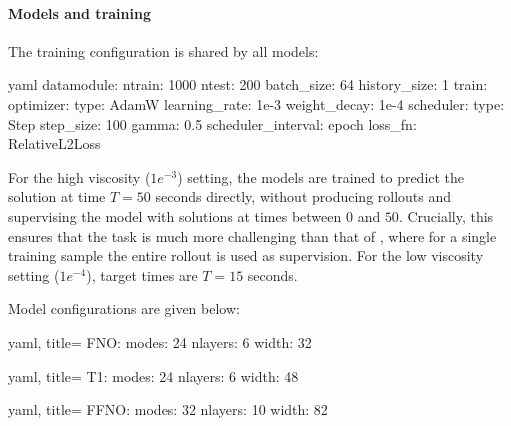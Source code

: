 \paragraph{Models and training}
%
The training configuration is shared by all models:

\begin{listing}[H]
\begin{mintedbox}{yaml}
datamodule: 
    ntrain: 1000
    ntest: 200
    batch_size: 64
    history_size: 1
train:
    optimizer: 
        type: AdamW
        learning_rate: 1e-3
        weight_decay: 1e-4
    scheduler: 
        type: Step
        step_size: 100
        gamma: 0.5
        scheduler_interval: epoch
loss_fn: RelativeL2Loss
\end{mintedbox}
\vspace{-6mm}
\end{listing}
%
For the high viscosity ($1e^{-3}$) setting, the models are trained to predict the solution at time $T=50$ seconds directly, without producing rollouts and supervising the model with solutions at times between $0$ and $50$. Crucially, this ensures that the task is much more challenging than that of \citep{li2020fourier}, where for a single training sample the entire rollout is used as supervision. For the low viscosity setting ($1e^{-4}$), target times are $T=15$ seconds.

Model configurations are given below:

\begin{listing}[H]
\begin{minipage}[t]{0.32\textwidth}
\begin{mintedbox}{yaml, title=}
FNO:
    modes: 24
    nlayers: 6
    width: 32 \end{mintedbox}
\end{minipage}
%
\begin{minipage}[t]{0.32\textwidth}
\begin{mintedbox}{yaml, title=\config{\ourmethod{}}}
T1:
    modes: 24
    nlayers: 6
    width: 48  \end{mintedbox}
\end{minipage}
%
\begin{minipage}[t]{0.32\textwidth}
\begin{mintedbox}{yaml, title=}
FFNO:
    modes: 32
    nlayers: 10
    width: 82 \end{mintedbox}
\end{minipage}
\vspace{-6mm}
\end{listing}

